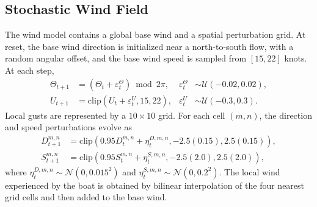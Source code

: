 \documentclass{article}
\begin{document}
\subsection{Stochastic Wind Field}
The wind model contains a global base wind and a spatial perturbation grid. At reset, the base wind direction is initialized near a north-to-south flow, with a random angular offset, and the base wind speed is sampled from $[15,22]$ knots. At each step,
\begin{align}
    \Theta_{t+1} &=
    (\Theta_t+\varepsilon^\Theta_t)\bmod 2\pi,
    &
    \varepsilon^\Theta_t &\sim \mathcal{U}(-0.02,0.02),\\
    U_{t+1} &=
    \mathrm{clip}(U_t+\varepsilon^U_t,15,22),
    &
    \varepsilon^U_t &\sim \mathcal{U}(-0.3,0.3).
\end{align}
Local gusts are represented by a $10\times 10$ grid. For each cell $(m,n)$, the direction and speed perturbations evolve as
\begin{align}
    D_{t+1}^{m,n}
    &=
    \mathrm{clip}\left(
        0.95D_t^{m,n}+\eta^{D,m,n}_t,
        -2.5(0.15),2.5(0.15)
    \right),\\
    S_{t+1}^{m,n}
    &=
    \mathrm{clip}\left(
        0.95S_t^{m,n}+\eta^{S,m,n}_t,
        -2.5(2.0),2.5(2.0)
    \right),
\end{align}
where $\eta^{D,m,n}_t\sim\mathcal{N}(0,0.015^2)$ and $\eta^{S,m,n}_t\sim\mathcal{N}(0,0.2^2)$. The local wind experienced by the boat is obtained by bilinear interpolation of the four nearest grid cells and then added to the base wind.
\end{document}
